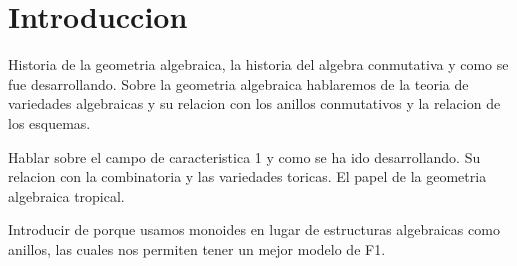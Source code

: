 \section{Introduccion}
\label{sec:introduccion}
Historia de la geometria algebraica, la historia del algebra conmutativa
y como se fue desarrollando. Sobre la geometria algebraica hablaremos de
la teoria de variedades algebraicas y su relacion con los anillos
conmutativos y la relacion de los esquemas.

Hablar sobre el campo de caracteristica 1 y como se ha ido desarrollando.
Su relacion con la combinatoria y las variedades toricas. El papel de la
geometria algebraica tropical.

Introducir de porque usamos monoides en lugar de estructuras algebraicas
como anillos, las cuales nos permiten tener un mejor modelo de F1.

